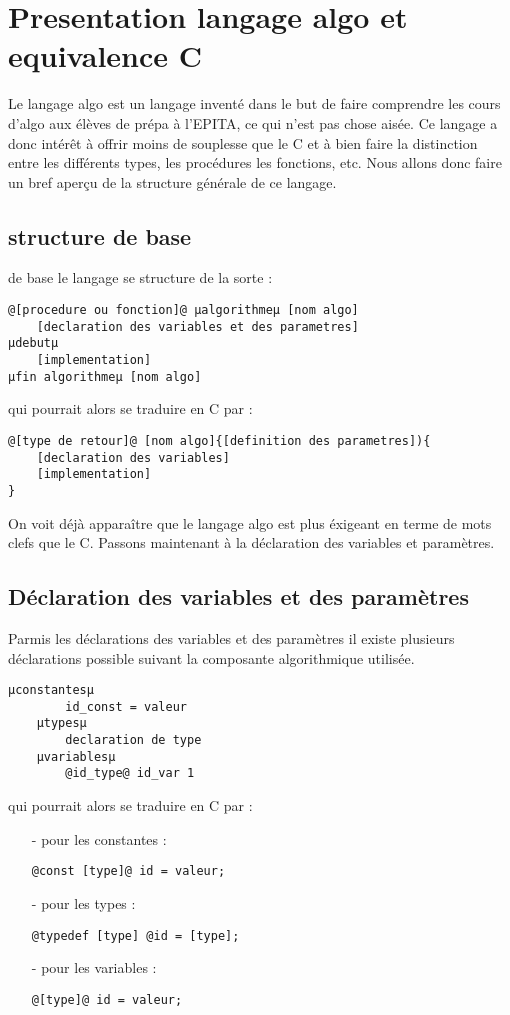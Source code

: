 
\section{Presentation langage algo et equivalence C}

	Le langage algo est un langage inventé dans le but de faire
comprendre les cours d'algo aux élèves de prépa à l'EPITA, ce qui n'est pas
chose aisée. Ce langage a donc intérêt à offrir moins de souplesse que le C
et à bien faire la distinction entre les différents types, les procédures les
fonctions, etc. Nous allons donc faire un bref aperçu de la 
structure générale de ce langage.

\subsection{structure de base}
\noindent de base le langage se structure de la sorte :

\begin{lstlisting}[style=base]
@[procedure ou fonction]@ µalgorithmeµ [nom algo]
	[declaration des variables et des parametres]
µdebutµ
	[implementation]
µfin algorithmeµ [nom algo]\end{lstlisting}
qui pourrait alors se traduire en C par :
\begin{lstlisting}[style=base]
@[type de retour]@ [nom algo]{[definition des parametres]){
	[declaration des variables]
	[implementation]
}
\end{lstlisting}

On voit déjà apparaître que le langage algo est plus éxigeant en terme de mots
clefs que le C. Passons maintenant à la déclaration des variables et paramètres.

\subsection{Déclaration des variables et des paramètres}
\noindent Parmis les déclarations des variables et des paramètres il existe
plusieurs déclarations possible suivant la composante algorithmique utilisée.

\begin{lstlisting}[style=base]
	µconstantesµ
		id_const = valeur
	µtypesµ
		declaration de type
	µvariablesµ
		@id_type@ id_var 1
\end{lstlisting}
\newpage
qui pourrait alors se traduire en C par : 

\begin{itemize}
	\item[-]\noindent pour les constantes : 
		\begin{lstlisting}[style=base]	
		@const [type]@ id = valeur;\end{lstlisting}	
	\item[-] pour les types :
		\begin{lstlisting}[style=base]			
	 @typedef [type] @id = [type];\end{lstlisting}
	\item[-] pour les variables :
		\begin{lstlisting}[style=base]			
		@[type]@ id = valeur;\end{lstlisting}
\end{itemize}

